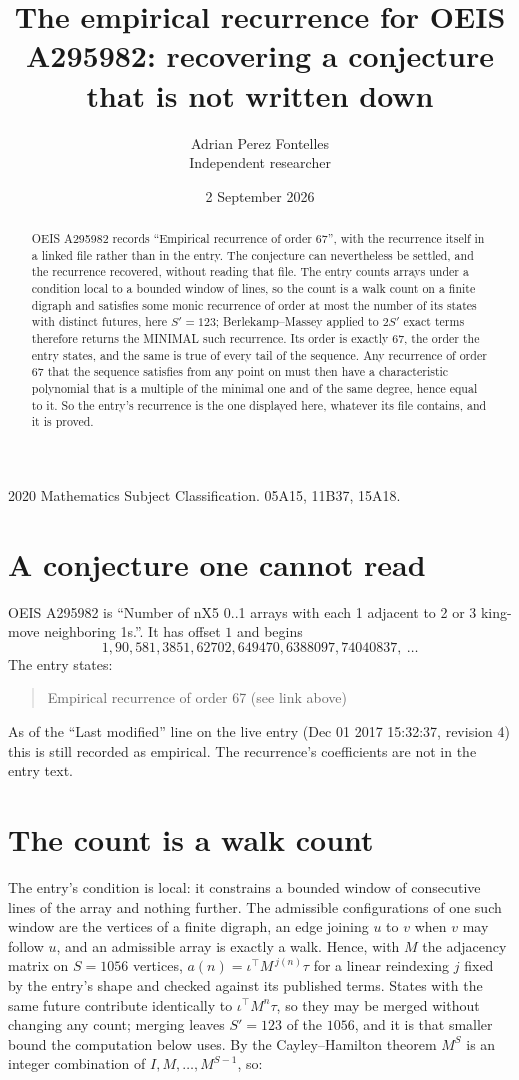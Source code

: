 \documentclass[11pt,a4paper]{article}
\title{The empirical recurrence for OEIS A295982: recovering a conjecture that is not written down}
\author{Adrian Perez Fontelles\\ \small Independent researcher}
\date{2 September 2026}
\theoremstyle{plain}
\theoremstyle{definition}
\begin{document}
\maketitle

\begin{abstract}
OEIS A295982 records ``Empirical recurrence of order $67$'', with the recurrence itself in a
linked file rather than in the entry. The conjecture can nevertheless be settled, and the
recurrence recovered, without reading that file. The entry counts arrays under a condition
local to a bounded window of lines, so the count is a walk count on a finite digraph and
satisfies some monic recurrence of order at most the number of its states with distinct
futures, here $S'=123$; Berlekamp--Massey applied to $2S'$ exact
terms therefore returns the MINIMAL such recurrence. Its order is exactly $67$, the order
the entry states, and the same is true of every tail of the sequence. Any recurrence of order
$67$ that the sequence satisfies from any point on must then have a characteristic
polynomial that is a multiple of the minimal one and of the same degree, hence equal to it. So
the entry's recurrence is the one displayed here, whatever its file contains, and it is
proved.
\end{abstract}

\noindent\small 2020 Mathematics Subject Classification. 05A15, 11B37, 15A18.\normalsize

\section{A conjecture one cannot read}

OEIS A295982 is ``Number of nX5 0..1 arrays with each 1 adjacent to 2 or 3 king-move neighboring 1s.''. It has offset $1$ and begins
\[
1, 90, 581, 3851, 62702, 649470, 6388097, 74040837,\ \dots
\]
The entry states:
\begin{quote}
Empirical recurrence of order 67 (see link above)
\end{quote}
As of the ``Last modified'' line on the live entry (Dec 01 2017 15:32:37, revision 4) this is still
recorded as empirical. The recurrence's coefficients are not in the entry text.

\section{The count is a walk count}

The entry's condition is local: it constrains a bounded window of consecutive lines of the
array and nothing further. The admissible configurations of one such window are the vertices
of a finite digraph, an edge joining $u$ to $v$ when $v$ may follow $u$, and an admissible
array is exactly a walk. Hence, with $M$ the adjacency matrix on $S=1056$ vertices,
$a(n)=\iota^{\!\top}M^{\,j(n)}\tau$ for a linear reindexing $j$ fixed by the entry's shape
and checked against its published terms. States with the same future contribute identically to $\iota^{\!\top}M^n\tau$, so they may be merged without changing any count; merging leaves $S'=123$ of the $1056$, and it is that smaller bound the computation below uses. By the Cayley--Hamilton theorem $M^{S}$ is an
integer combination of $I,M,\dots,M^{S-1}$, so:
\end{document}
